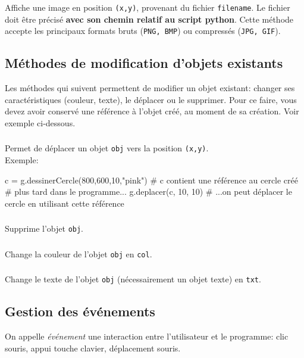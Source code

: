 \documentclass[11pt,a4paper]{article}
\begin{document}
\subsubsection*{}
Affiche une image en position {\tt (x,y)}, provenant du fichier {\tt filename}. Le fichier doit être précisé {\bf avec son chemin relatif au script python}. Cette méthode accepte les principaux formats bruts ({\tt PNG, BMP}) ou compressés ({\tt JPG, GIF}).

\subsection*{Méthodes de modification d'objets existants}
Les méthodes qui suivent permettent de modifier un objet existant: changer ses caractéristiques (couleur, texte), le déplacer ou le supprimer. Pour ce faire, vous devez avoir conservé une référence à l'objet créé, au moment de sa création. Voir exemple ci-dessous.
\subsubsection*{}
Permet de déplacer un objet {\tt obj} vers la position {\tt (x,y)}.\\
Exemple:
\begin{ccode}
    c = g.dessinerCercle(800,600,10,"pink") # c contient une référence au cercle créé
    # plus tard dans le programme...
    g.deplacer(c, 10, 10) # ...on peut déplacer le cercle en utilisant cette référence
\end{ccode}

\subsubsection*{}
Supprime l'objet {\tt obj}.

\subsubsection*{}
Change la couleur de l'objet {\tt obj} en {\tt col}.

\subsubsection*{}
Change le texte de l'objet {\tt obj} (nécessairement un objet texte) en {\tt txt}.

\subsection*{Gestion des événements}
On appelle {\it événement} une interaction entre l'utilisateur et le programme: clic souris, appui touche clavier, déplacement souris.
\end{document}
